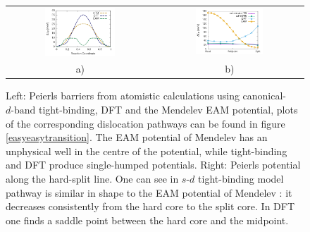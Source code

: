\documentclass[a4paper,11pt]{article}
\begin{document}
        \begin{figure}
\centering
    \begin{tabular}{cc}
	     \includegraphics[width=0.5\textwidth]{Images/peierls_potential_atomistic_results.png} &
             \includegraphics[width=0.48\textwidth]{Images/hard-split_transition_w_canonical.png}  \\
a) & b)\\
    \end{tabular}
\caption{Left: Peierls barriers from atomistic calculations using  canonical-$d\text{-band}$ tight-binding, DFT and the Mendelev EAM potential, plots of the corresponding dislocation pathways can be found in figure \ref{easyeasytransition}. The EAM potential of Mendelev \cite{Mendelev2003} has an unphysical well in the centre of the potential, while tight-binding and DFT produce single-humped potentials. Right: Peierls potential along the hard-split line. One can see in $s\text{-}d$ tight-binding model pathway is similar in shape to the EAM potential of Mendelev \cite{Mendelev2003}: it decreases consistently from the hard core to the split core. In DFT one finds a saddle point between the hard core and the midpoint. }
   \label{hardsplittransition}
    \end{figure}
\end{document}
